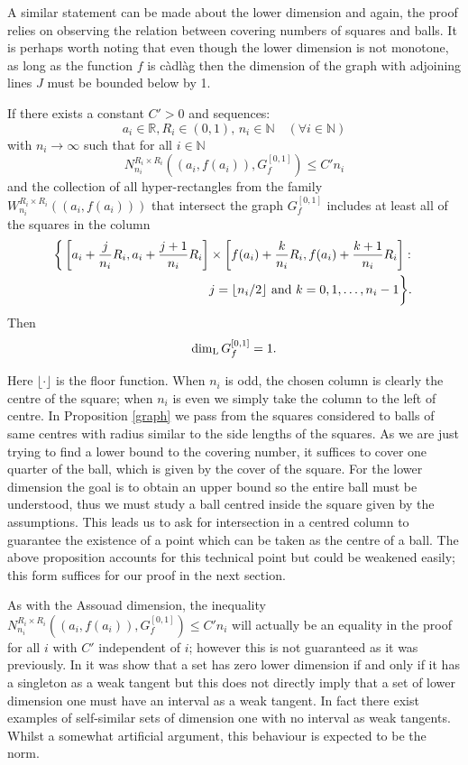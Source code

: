 A similar statement can be made about the lower dimension and again, the proof relies on observing the relation between covering numbers of squares and balls. It is perhaps worth noting that even though the lower dimension is not monotone, as long as the function $f$ is c\`adl\`ag then the dimension of the graph with adjoining lines $J$ must be bounded below by 1.
\begin{proposition}\label{graph-lower}
	If there exists a constant $C'>0$ and sequences:
	\[
	a_i\in \mathbb{R},R_i\in (0,1),\, n_i\in\mathbb{N} \quad (\forall i\in \mathbb{N})
	\]
	with $n_i \rightarrow \infty$ such that for all $i\in\mathbb{N}$
	\[
	N_{n_i}^{R_i \times R_i }((a_i,f(a_i)),G_f^{[0,1]})\leq C' n_i
	\]
	and the collection of all hyper-rectangles from the family $W_{n_i}^{R_i \times R_i}((a_i,f(a_i)))$ that intersect the graph $G_f^{[0,1]}$ includes at least all of the squares in the column 
	\begin{align*}
	    	\bigg\{ \left[a_i + \frac{j}{n_i}R_i, a_i + \frac{j+1}{n_i}R_i \right] &\times \left[f(a_i) + \frac{k}{n_i}R_i, f(a_i) + \frac{k+1}{n_i}R_i \right] \colon \\
	    	&j = \lfloor n_i/2 \rfloor \textup{ and } k = 0, 1,\ldots, n_i - 1 \bigg\}.
	\end{align*}
	Then
	\[
	\dim_{\textup{L}} G_f^{[0,1]}=1.
	\]
\end{proposition}

Here $\lfloor \cdot \rfloor$ is the floor function. When $n_i$ is odd, the chosen column is clearly the centre of the square; when $n_i$ is even we simply take the column to the left of centre. In Proposition \ref{graph} we pass from the squares considered to balls of same centres with radius similar to the side lengths of the squares. As we are just trying to find a lower bound to the covering number, it suffices to cover one quarter of the ball, which is given by the cover of the square. For the lower dimension the goal is to obtain an upper bound so the entire ball must be understood, thus we must study a ball centred inside the square given by the assumptions. This leads us to ask for intersection in a centred column to guarantee the existence of a point which can be taken as the centre of a ball. The above proposition accounts for this technical point but could be weakened easily; this form suffices for our proof in the next section.

As with the Assouad dimension, the inequality $N_{n_i}^{R_i \times R_i }((a_i,f(a_i)),G_f^{[0,1]})\leq C' n_i$ will actually be an equality in the proof for all $i$ with $C'$ independent of $i$; however this is not guaranteed as it was previously. In \cite{microsets} it was show that a set has zero lower dimension if and only if it has a singleton as a weak tangent but this does not directly imply that a set of lower dimension one must have an interval as a weak tangent. In fact there exist examples of self-similar sets of dimension one with no interval as weak tangents. Whilst a somewhat artificial argument, this behaviour is expected to be the norm.


